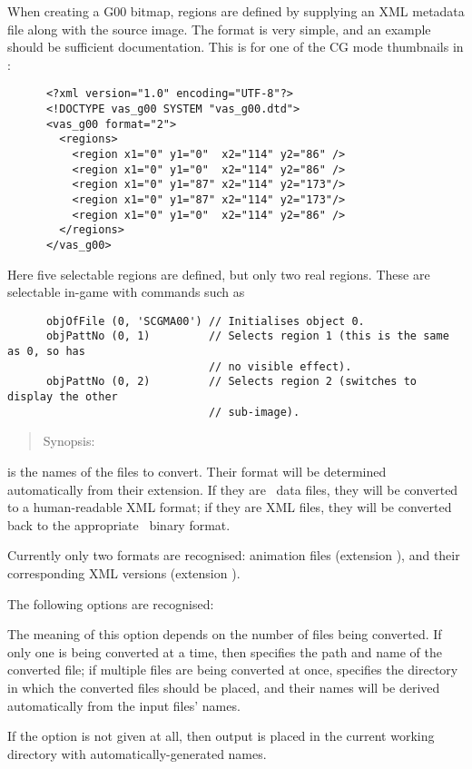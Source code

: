    When creating a G00 bitmap, regions are defined by supplying an XML metadata
    file along with the source image.  The format is very simple, and an example
    should be sufficient documentation.  This is for one of the CG mode thumbnails
    in :
    \begin{lstlisting}
      <?xml version="1.0" encoding="UTF-8"?>
      <!DOCTYPE vas_g00 SYSTEM "vas_g00.dtd">
      <vas_g00 format="2">
        <regions>
          <region x1="0" y1="0"  x2="114" y2="86" />
          <region x1="0" y1="0"  x2="114" y2="86" />
          <region x1="0" y1="87" x2="114" y2="173"/>
          <region x1="0" y1="87" x2="114" y2="173"/>
          <region x1="0" y1="0"  x2="114" y2="86" />
        </regions>
      </vas_g00>
    \end{lstlisting}
    \noindent Here five selectable regions are defined, but only two real
    regions.  These are selectable in-game with commands such as
    \begin{lstlisting}
      objOfFile (0, 'SCGMA00') // Initialises object 0.
      objPattNo (0, 1)         // Selects region 1 (this is the same as 0, so has
                               // no visible effect).
      objPattNo (0, 2)         // Selects region 2 (switches to display the other
                               // sub-image).
    \end{lstlisting}

\clearpage
{}

  \begin{quote}
    Synopsis:   
  \end{quote}

  \noindent{} is the names of the files to convert.  Their format 
  will be determined automatically from their extension.  If they are \reallive\ 
  data files, they will be converted to a human-readable XML format; if they are 
  XML files, they will be converted back to the appropriate \reallive\ binary 
  format.
  
  Currently only two formats are recognised:  animation files (extension
  \file{.gan}), and their corresponding XML versions (extension \file{.ganxml}).

  The following options are recognised:

  \begin{nicelist}
  \item[\clbarg{o}{output}{NAME}]
    The meaning of this option depends on the number of files being converted. 
    If only one is being converted at a time, then  specifies the path
    and name of the converted file; if multiple files are being converted at 
    once, \clopt{o} specifies the directory in which the converted files should 
    be placed, and their names will be derived automatically from the input 
    files' names.
    
    If the option is not given at all, then output is placed in the current 
    working directory with automatically-generated names.
  \end{nicelist}

